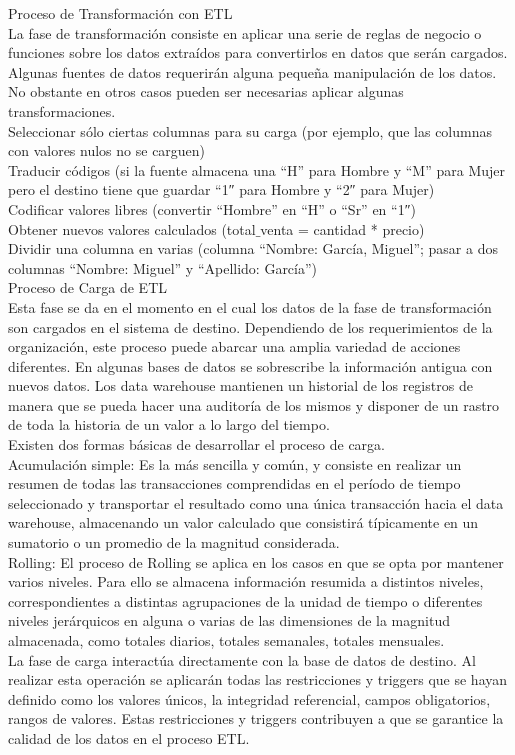 \documentclass[DIV=calc, paper=a4, fontsize=11pt, twocolumn]{scrartcl}	 %
\begin{document}
Proceso de Transformaci\'{o}n con ETL\\
La fase de transformaci\'{o}n consiste en aplicar una serie de reglas de negocio o funciones sobre los datos extra\'{i}dos 
para convertirlos en datos que ser\'{a}n cargados. Algunas fuentes de datos requerir\'{a}n alguna peque\~{n}a manipulaci\'{o}n de 
los datos. No obstante en otros casos pueden ser necesarias aplicar algunas transformaciones.\\
Seleccionar s\'{o}lo ciertas columnas para su carga (por ejemplo, que las columnas con valores nulos no se carguen)\\
Traducir c\'{o}digos (si la fuente almacena una “H” para Hombre y “M” para Mujer pero el destino tiene que guardar “1″ para Hombre y “2″ para Mujer)\\
Codificar valores libres (convertir “Hombre” en “H” o “Sr” en “1″)\\
Obtener nuevos valores calculados (total$\_$venta = cantidad * precio)\\
Dividir una columna en varias (columna “Nombre: Garc\'{i}a, Miguel”; pasar a dos columnas “Nombre: Miguel” y “Apellido: Garc\'{i}a”)\\

Proceso de Carga de ETL\\
Esta fase se da en el momento en el cual los datos de la fase de transformaci\'{o}n son cargados en el sistema de destino. 
Dependiendo de los requerimientos de la organizaci\'{o}n, este proceso puede abarcar una amplia variedad de acciones diferentes. 
En algunas bases de datos se sobrescribe la informaci\'{o}n antigua con nuevos datos. Los data warehouse mantienen un historial 
de los registros de manera que se pueda hacer una auditor\'{i}a de los mismos y disponer de un rastro de toda la historia de un 
valor a lo largo del tiempo.\\
Existen dos formas b\'{a}sicas de desarrollar el proceso de carga.\\
Acumulaci\'{o}n simple: Es la m\'{a}s sencilla y com\'{u}n, y consiste en realizar un resumen de todas las transacciones comprendidas 
en el per\'{i}odo de tiempo seleccionado y transportar el resultado como una \'{u}nica transacci\'{o}n hacia el data warehouse, 
almacenando un valor calculado que consistir\'{a} t\'{i}picamente en un sumatorio o un promedio de la magnitud considerada.\\
Rolling: El proceso de Rolling se aplica en los casos en que se opta por mantener varios niveles. Para ello se almacena 
informaci\'{o}n resumida a distintos niveles, correspondientes a distintas agrupaciones 
de la unidad de tiempo o diferentes niveles jer\'{a}rquicos en alguna o varias de las dimensiones de la magnitud almacenada, como totales 
diarios, totales semanales, totales mensuales.\\
La fase de carga interact\'{u}a directamente con la base de datos de destino. Al realizar esta operaci\'{o}n se aplicar\'{a}n todas 
las restricciones y triggers que se hayan definido como los valores \'{u}nicos, la integridad referencial, campos 
obligatorios, rangos de valores. Estas restricciones y triggers contribuyen a que se garantice 
la calidad de los datos en el proceso ETL.\\
\end{document}
